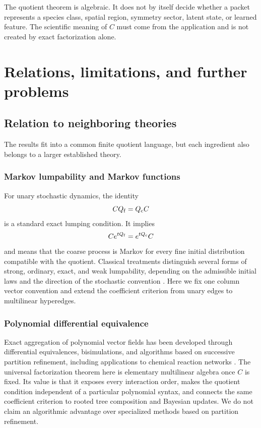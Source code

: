 \begin{PRIQboundary}
The quotient theorem is algebraic.  It does not by itself decide whether a packet represents a species class, spatial region, symmetry sector, latent state, or learned feature.  The scientific meaning of $C$ must come from the application and is not created by exact factorization alone.
\end{PRIQboundary}


\chapter{Relations, limitations, and further problems}\label{PRIQ:book:chapter-45}
\section{Relation to neighboring theories}\label{PRIQ:sec:relations}

The results fit into a common finite quotient language, but each ingredient also belongs to a larger established theory.

\subsection{Markov lumpability and Markov functions}
For unary stochastic dynamics, the identity
\[
  CQ_{\mathrm f}=Q_{\mathrm c}C
\]
is a standard exact lumping condition.  It implies
\[
  Ce^{tQ_{\mathrm f}}=e^{tQ_{\mathrm c}}C
\]
and means that the coarse process is Markov for every fine initial distribution compatible with the quotient.  Classical treatments distinguish several forms of strong, ordinary, exact, and weak lumpability, depending on the admissible initial laws and the direction of the stochastic convention \cite{PRIQ:KemenySnell1960,PRIQ:RogersPitman1981,PRIQ:Buchholz1994}.  Here we fix one column vector convention and extend the coefficient criterion from unary edges to multilinear hyperedges.

\subsection{Polynomial differential equivalence}
Exact aggregation of polynomial vector fields has been developed through differential equivalences, bisimulations, and algorithms based on successive partition refinement, including applications to chemical reaction networks \cite{PRIQ:Cardelli2015,PRIQ:Cardelli2017}.  The universal factorization theorem here is elementary multilinear algebra once $C$ is fixed.  Its value is that it exposes every interaction order, makes the quotient condition independent of a particular polynomial syntax, and connects the same coefficient criterion to rooted tree composition and Bayesian updates.  We do not claim an algorithmic advantage over specialized methods based on partition refinement.

